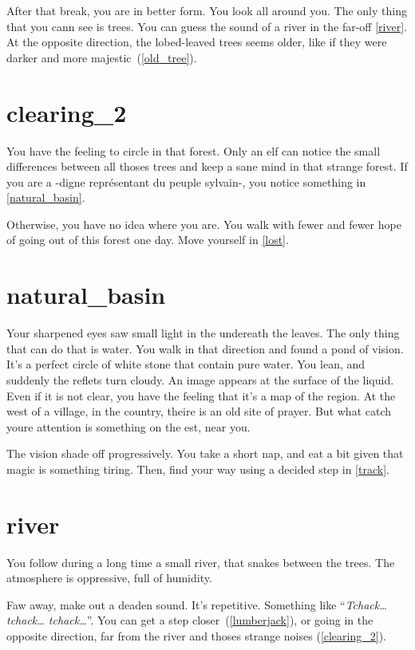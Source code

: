 After that break, you are in better form. You look all around you. The only
thing that you cann see is trees. You can guess the sound of a river in the
far-off \ref{river}. At the opposite direction, the lobed-leaved trees seems
older, like if they were darker and more majestic~(\ref{old_tree}).

\section{clearing_2}

You have the feeling to circle in that forest. Only an elf can notice the small
differences between all thoses trees and keep a sane mind in that strange
forest. If you are a -digne représentant du peuple sylvain-, you notice
something in \ref{natural_basin}.

Otherwise, you have no idea where you are. You walk with fewer and fewer hope of
going out of this forest one day. Move yourself in \ref{lost}.

\section{natural_basin}

Your sharpened eyes saw small light in the undereath the leaves. The only
thing that can do that is water. You walk in that direction and found a pond
of vision. It's a perfect circle of white stone that contain pure water. You
lean, and suddenly the reflets turn cloudy. An image appears at
the surface of the liquid. Even if it is not clear, you have the feeling that
it's a map of the region. At the west of a village, in the country, theire is an
old site of prayer. But what catch youre attention is something on the est,
near you.

The vision shade off progressively. You take a short nap, and eat a bit
given that magic is something tiring. Then, find your way using a decided step
in \ref{track}.

\section{river}

You follow during a long time a small river, that snakes between the trees.
The atmosphere is oppressive, full of humidity.

Faw away, make out a deaden sound. It's repetitive. Something like
``\textit{Tchack… tchack… tchack…}''. You can get a step closer~(\ref{lumberjack}), or
going in the opposite direction, far from the river and thoses strange noises
(\ref{clearing_2}).


